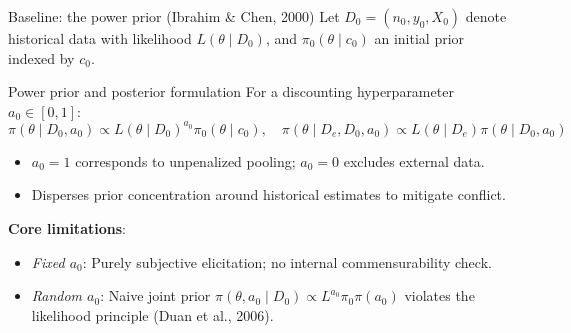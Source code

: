 \documentclass[t]{beamer}
\begin{document}
\begin{frame}{Baseline: the power prior (Ibrahim \& Chen, 2000)}
    \vspace{0.1cm}
    Let $D_0 = (n_0, y_0, X_0)$ denote historical data with likelihood $L(\theta \mid D_0)$, and $\pi_0(\theta \mid c_0)$ an initial prior indexed by $c_0$.

    \begin{block}{Power prior and posterior formulation}
    For a discounting hyperparameter $a_0 \in [0, 1]$:
    \begin{equation*}
        \pi(\theta \mid D_0, a_0) \propto L(\theta \mid D_0)^{a_0} \pi_0(\theta \mid c_0), \quad
        \pi(\theta \mid D_e, D_0, a_0) \propto L(\theta \mid D_e) \pi(\theta \mid D_0, a_0)
    \end{equation*}
    \end{block}

    \begin{itemize}
        \item $a_0 = 1$ corresponds to unpenalized pooling; $a_0 = 0$ excludes external data.
        \item Disperses prior concentration around historical estimates to mitigate conflict.
    \end{itemize}

    \vspace{0.15cm}
    \textbf{Core limitations}:
    \begin{itemize}
        \setlength{\itemsep}{0.1cm}
        \item \emph{Fixed $a_0$}: Purely subjective elicitation; no internal commensurability check.
        \item \emph{Random $a_0$}: Naive joint prior $\pi(\theta, a_0 \mid D_0) \propto L^{a_0} \pi_0 \pi(a_0)$ violates the likelihood principle (Duan et al., 2006).
    \end{itemize}
\end{frame}
\end{document}
